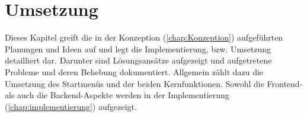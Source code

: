 

\chapter{Umsetzung}
\label{chap:Umsetzung}
Dieses Kapitel greift die in der Konzeption (\ref{chap:Konzeption}) aufgeführten Planungen und Ideen auf und legt die Implementierung, bzw. 
Umsetzung detailliert dar. Darunter sind Lösungsansätze aufgezeigt und aufgetretene Probleme und deren Behebung dokumentiert. Allgemein zählt 
dazu die Umsetzung des Startmenüs und der beiden Kernfunktionen. Sowohl die Frontend- als auch die Backend-Aspekte werden in der Implementierung 
(\ref{chap:implementierung}) aufgezeigt. 

